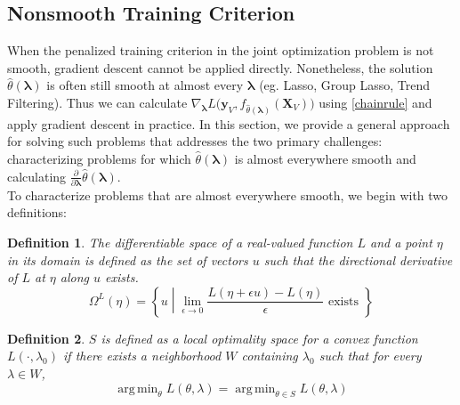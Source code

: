 \documentclass[10pt,letterpaper]{article}
\newtheorem{definition}{Definition}
\DeclareMathOperator*{\argmin}{arg\,min}
\begin{document}
\subsection{Nonsmooth Training Criterion}
When the penalized training criterion in the joint optimization problem is not smooth, gradient descent cannot be applied directly. Nonetheless, the solution $\hat{\theta}\left(\boldsymbol{\lambda}\right)$ is often still smooth at almost every $\boldsymbol{\lambda}$ (eg. Lasso, Group Lasso, Trend Filtering). Thus we can calculate $\nabla_{\boldsymbol{\lambda}} L \Big( \boldsymbol{y}_V, f_{\hat{\theta}(\boldsymbol{\lambda})}(\boldsymbol{X}_V) \Big )$ using \eqref{chainrule} and apply gradient descent in practice. In this section, we provide a general approach for solving such problems that addresses the two primary challenges: characterizing problems for which $\hat{\theta}\left(\boldsymbol{\lambda}\right)$ is almost everywhere smooth and calculating $\frac{\partial}{\partial \boldsymbol{\lambda}} \hat{\theta}(\boldsymbol{\lambda})$.\\

\vspace{2mm}
To characterize problems that are almost everywhere smooth, we begin with two definitions:
\begin{definition}
The differentiable space of a real-valued function $L$ and a point $\eta$ in its domain is defined as the set of vectors $u$ such that the directional derivative of $L$ at $\eta$ along $u$ exists.
\begin{equation}
\Omega^{L}(\eta) = \left \{ u \middle | \lim_{\epsilon \rightarrow 0} \frac{L(\eta + \epsilon u) - L(\eta)}{\epsilon} \text{ exists } \right \}
\end{equation}
\end{definition}

\begin{definition}
$S$ is defined as a local optimality space for a convex function $L(\cdot, \lambda_0)$ if there exists a neighborhood $W$ containing $\lambda_0$ such that for every $\lambda \in W$,
\begin{equation}
\argmin_\theta L(\theta, \lambda) = \argmin_{\theta \in S} L(\theta, \lambda)
\end{equation}
\end{definition}
\end{document}
